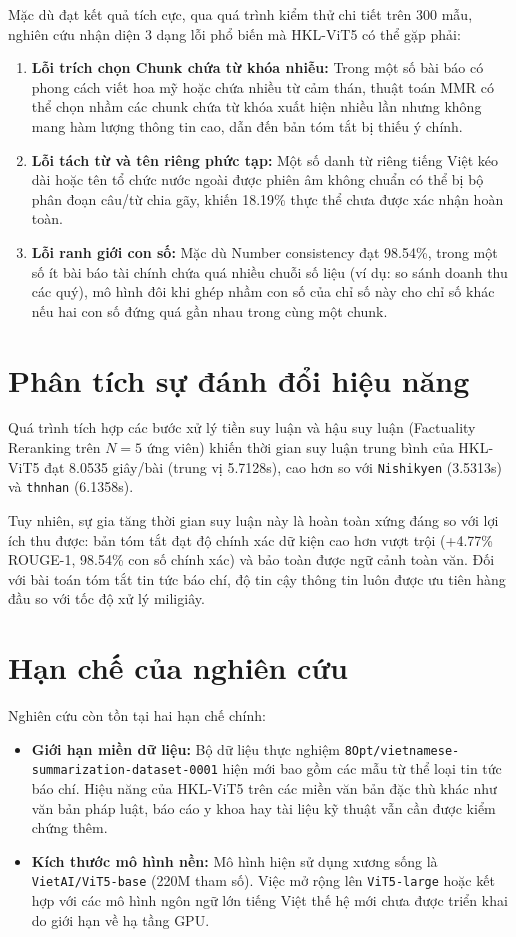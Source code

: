 Mặc dù đạt kết quả tích cực, qua quá trình kiểm thử chi tiết trên 300 mẫu, nghiên cứu nhận diện 3 dạng lỗi phổ biến mà HKL-ViT5 có thể gặp phải:

\begin{enumerate}[label=\arabic*.]
  \item \textbf{Lỗi trích chọn Chunk chứa từ khóa nhiễu:} Trong một số bài báo có phong cách viết hoa mỹ hoặc chứa nhiều từ cảm thán, thuật toán MMR có thể chọn nhầm các chunk chứa từ khóa xuất hiện nhiều lần nhưng không mang hàm lượng thông tin cao, dẫn đến bản tóm tắt bị thiếu ý chính.
  \item \textbf{Lỗi tách từ và tên riêng phức tạp:} Một số danh từ riêng tiếng Việt kéo dài hoặc tên tổ chức nước ngoài được phiên âm không chuẩn có thể bị bộ phân đoạn câu/từ chia gãy, khiến 18.19\% thực thể chưa được xác nhận hoàn toàn.
  \item \textbf{Lỗi ranh giới con số:} Mặc dù Number consistency đạt 98.54\%, trong một số ít bài báo tài chính chứa quá nhiều chuỗi số liệu (ví dụ: so sánh doanh thu các quý), mô hình đôi khi ghép nhầm con số của chỉ số này cho chỉ số khác nếu hai con số đứng quá gần nhau trong cùng một chunk.
\end{enumerate}

\section{Phân tích sự đánh đổi hiệu năng}

Quá trình tích hợp các bước xử lý tiền suy luận và hậu suy luận (Factuality Reranking trên $N=5$ ứng viên) khiến thời gian suy luận trung bình của HKL-ViT5 đạt 8.0535 giây/bài (trung vị 5.7128s), cao hơn so với \texttt{Nishikyen} (3.5313s) và \texttt{thnhan} (6.1358s).

Tuy nhiên, sự gia tăng thời gian suy luận này là hoàn toàn xứng đáng so với lợi ích thu được: bản tóm tắt đạt độ chính xác dữ kiện cao hơn vượt trội (+4.77\% ROUGE-1, 98.54\% con số chính xác) và bảo toàn được ngữ cảnh toàn văn. Đối với bài toán tóm tắt tin tức báo chí, độ tin cậy thông tin luôn được ưu tiên hàng đầu so với tốc độ xử lý miligiây.

\section{Hạn chế của nghiên cứu}

Nghiên cứu còn tồn tại hai hạn chế chính:

\begin{itemize}
  \item \textbf{Giới hạn miền dữ liệu:} Bộ dữ liệu thực nghiệm \texttt{8Opt/vietnamese-summarization-dataset-0001} hiện mới bao gồm các mẫu từ thể loại tin tức báo chí. Hiệu năng của HKL-ViT5 trên các miền văn bản đặc thù khác như văn bản pháp luật, báo cáo y khoa hay tài liệu kỹ thuật vẫn cần được kiểm chứng thêm.
  \item \textbf{Kích thước mô hình nền:} Mô hình hiện sử dụng xương sống là \texttt{VietAI/ViT5-base} (220M tham số). Việc mở rộng lên \texttt{ViT5-large} hoặc kết hợp với các mô hình ngôn ngữ lớn tiếng Việt thế hệ mới chưa được triển khai do giới hạn về hạ tầng GPU.
\end{itemize}

